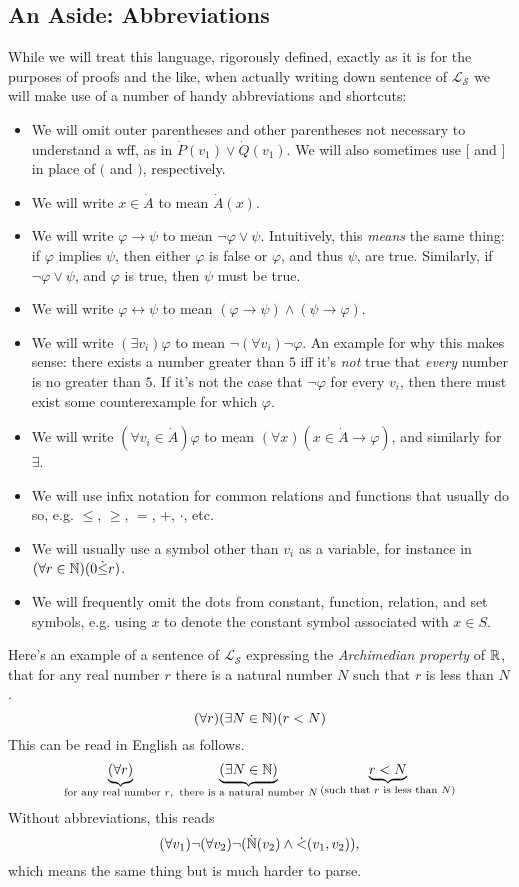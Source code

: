 \subsection{An Aside: Abbreviations}
While we will treat this language, rigorously defined, exactly as it is for the purposes of proofs and the like, when actually writing down sentence of $\mathcal{L}_\mathscr{S}$ we will make use of a number of handy abbreviations and shortcuts:
\begin{itemize}
    \item We will omit outer parentheses and other parentheses not necessary to understand a wff, as in $\dot P(v_1) \lor \dot Q(v_1)$. We will also sometimes use $[$ and $]$ in place of $($ and $)$, respectively.
    \item We will write $x \in \dot A$ to mean $\dot A(x)$.
    \item We will write $\varphi \to \psi$ to mean $\neg \varphi \lor \psi$. Intuitively, this \textit{means} the same thing: if $\varphi$ implies $\psi$, then either $\varphi$ is false or $\varphi$, and thus $\psi$, are true. Similarly, if $\neg \varphi \lor \psi$, and $\varphi$ is true, then $\psi$ must be true.
    \item We will write $\varphi \leftrightarrow \psi$ to mean $(\varphi \to \psi) \land (\psi \to \varphi)$.
    \item We will write $(\exists v_i) \varphi$ to mean $\neg (\forall v_i) \neg \varphi$. An example for why this makes sense: there exists a number greater than $5$ iff it's \textit{not} true that \textit{every} number is no greater than $5$. If it's not the case that $\neg \varphi$ for every $v_i$, then there must exist some counterexample for which $\varphi$.
    \item We will write $(\forall v_i \in \dot A)\varphi$ to mean $(\forall x)(x \in \dot A \to \varphi)$, and similarly for $\exists$.
    \item We will use infix notation for common relations and functions that usually do so, e.g. $\leq$, $\geq$, $=$, $+$, $\cdot$, etc.
    \item We will usually use a symbol other than $v_i$ as a variable, for instance in $(\forall r \in \mathbb{N}) (0 \dot \leq r)$.
    \item We will frequently omit the dots from constant, function, relation, and set symbols, e.g. using $x$ to denote the constant symbol associated with $x \in S$.
\end{itemize}

Here's an example of a sentence of $\mathcal{L}_\mathscr{S}$ expressing the \textit{Archimedian property} of $\mathbb{R}$, that for any real number $r$ there is a natural number $N$ such that $r$ is less than $N$.
\[ (\forall r)(\exists N \in \mathbb{N})(r < N) \]
This can be read in English as follows.
\[ \underbrace{(\forall r)}_{\text{for any real number $r$,\ }}\underbrace{(\exists N \in \mathbb{N})}_{\text{there is a natural number $N$}}\underbrace{r < N}_{\text{(such that $r$ is less than $N$)}} \]
Without abbreviations, this reads
\[ (\forall v_1) \neg (\forall v_2) \neg (\dot {\mathbb{N}} (v_2) \land \dot <(v_1, v_2)), \]
which means the same thing but is much harder to parse.


